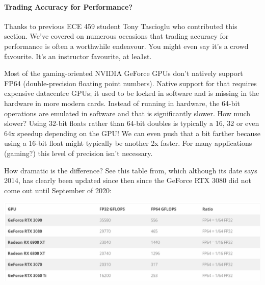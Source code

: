 \paragraph{Trading Accuracy for Performance?}
Thanks to previous ECE 459 student Tony Tascioglu who contributed this section. We've covered on numerous occasions that trading accuracy for performance is often a worthwhile endeavour. You might even say it's a crowd favourite. It's an instructor favourite, at lea1st.

Most of the gaming-oriented NVIDIA GeForce GPUs don't natively support FP64 (double-precision floating point numbers). Native support for that requires expensive datacentre GPUs; it used to be locked in software and is missing in the hardware in more modern cards. Instead of running in hardware, the 64-bit operations are emulated in software and that is significantly slower.  How much slower? Using 32-bit floats rather than 64-bit doubles is typically a 16, 32 or even 64x speedup depending on the GPU! We can even push that a bit farther because using a 16-bit float might typically be another 2x faster. For many applications (gaming?) this level of precision isn't necessary. 

How dramatic is the difference? See this table from\cite{fp3264}, which although its date says 2014, has clearly been updated since then since the GeForce RTX 3080 did not come out until September of 2020:

	\begin{center}
		\includegraphics[width=\textwidth]{images/gpu-fp32-fp64-table.png}
	\end{center}





